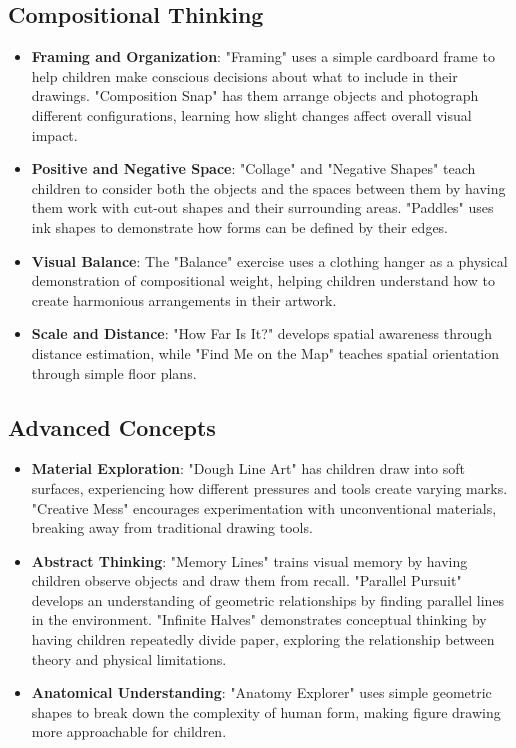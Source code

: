 \documentclass{article}
\begin{document}
\subsection{Compositional Thinking}
\begin{itemize}
    \item \textbf{Framing and Organization}: "Framing" uses a simple cardboard frame to help children make conscious decisions about what to include in their drawings. "Composition Snap" has them arrange objects and photograph different configurations, learning how slight changes affect overall visual impact.
    \item \textbf{Positive and Negative Space}: "Collage" and "Negative Shapes" teach children to consider both the objects and the spaces between them by having them work with cut-out shapes and their surrounding areas. "Paddles" uses ink shapes to demonstrate how forms can be defined by their edges.
    \item \textbf{Visual Balance}: The "Balance" exercise uses a clothing hanger as a physical demonstration of compositional weight, helping children understand how to create harmonious arrangements in their artwork.
    \item \textbf{Scale and Distance}: "How Far Is It?" develops spatial awareness through distance estimation, while "Find Me on the Map" teaches spatial orientation through simple floor plans.
\end{itemize}

\subsection{Advanced Concepts}
\begin{itemize}
    \item \textbf{Material Exploration}: "Dough Line Art" has children draw into soft surfaces, experiencing how different pressures and tools create varying marks. "Creative Mess" encourages experimentation with unconventional materials, breaking away from traditional drawing tools.
    \item \textbf{Abstract Thinking}: "Memory Lines" trains visual memory by having children observe objects and draw them from recall. "Parallel Pursuit" develops an understanding of geometric relationships by finding parallel lines in the environment. "Infinite Halves" demonstrates conceptual thinking by having children repeatedly divide paper, exploring the relationship between theory and physical limitations.
    \item \textbf{Anatomical Understanding}: "Anatomy Explorer" uses simple geometric shapes to break down the complexity of human form, making figure drawing more approachable for children.
\end{itemize}
\end{document}
